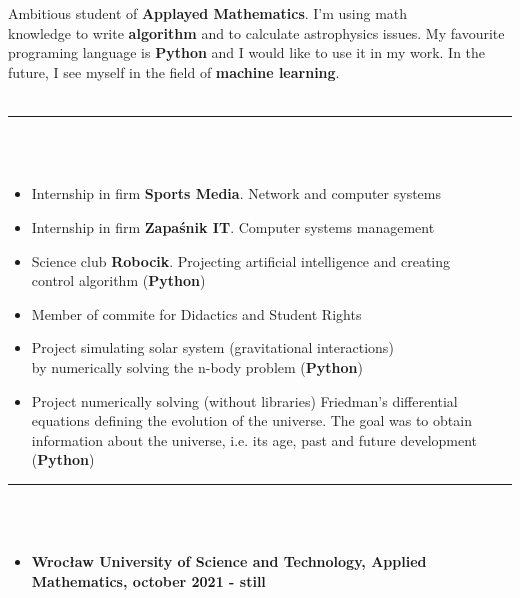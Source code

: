 \documentclass[10pt]{article}
\begin{document}
    \begin{minipage}[t]{0.60\textwidth}
        \fontsize{10pt}{10pt} \\ \\
        Ambitious student of \textbf{Applayed Mathematics}. I'm using math \\ knowledge to write \textbf{algorithm} and to calculate astrophysics issues.
        My favourite programing language is \textbf{Python} and I would like to use it in my work. In the future, I see myself in the field of \textbf{machine learning}. \\ \\
        \rule{11cm}{1pt} \\ \\
        \fontsize{10pt}{10pt}
        \begin{itemize}[leftmargin=*]
            \setlength{\parskip}{0pt}
            \item Internship in firm \textbf{Sports Media}. Network and computer systems 
            \item Internship in firm \textbf{Zapaśnik IT}. Computer systems management
            \item Science club \textbf{Robocik}. Projecting artificial intelligence and creating \\ control algorithm  (\textbf{Python})
            \item Member of commite for Didactics and Student Rights
            \item Project simulating solar system (gravitational interactions) \\ by numerically solving the n-body problem  (\textbf{Python})
            \item Project numerically solving (without libraries) Friedman's differential equations defining the evolution of the universe.
            The goal was to obtain information about the universe, i.e. its age, past and future development (\textbf{Python})
        \end{itemize}
        \rule{11cm}{1pt} \\ \\
        \fontsize{10pt}{10pt}
        \begin{itemize}[leftmargin=*]
            \setlength{\parskip}{0pt}
            \item \textbf{Wrocław University of Science and Technology, Applied Mathematics, october 2021 - still}

\end{itemize}
\end{minipage}
\end{document}
